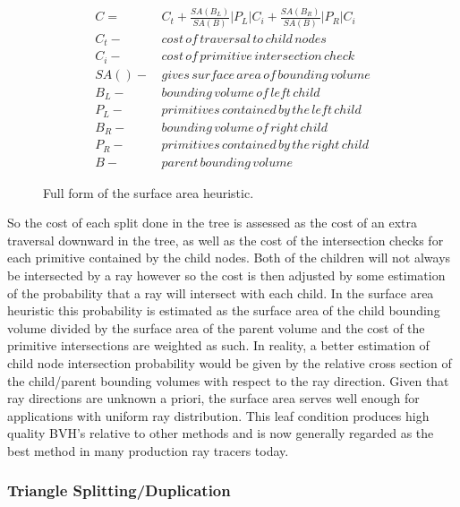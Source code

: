 \documentclass[12pt, a4paper]{article}
\begin{document}
\begin{figure}
  \caption{Full form of the surface area heuristic.}
  \label{SAH}
\begin{centering}
  \begin{align*}
    C = & \,C_{t} + \frac{SA(B_{L})}{SA(B)} |P_{L}|C_{i} +  \frac{SA(B_{R})}{SA(B)} |P_{R}|C_{i} \\ C_{t} - & \,cost\, of\, traversal\, to\, child\, nodes \\ C_{i} - & \, cost\, of\, primitive\, intersection\, check\, \\ SA() - & \, gives\, surface\, area\, of\, bounding\, volume \\ B_{L} - & \, bounding\, volume\, of\, left\, child \\ P_{L} - & \, primitives\, contained\, by\, the\, left\, child  \\ B_{R} - & \, bounding\, volume\, of\, right\, child \\ P_{R} - & \, primitives\, contained\, by\, the\, right\, child \\ B - & \, parent\, bounding\, volume
  \end{align*}
\end{centering}
\end{figure}

So the cost of each split done in the tree is assessed as the cost of an extra traversal downward in the tree, as well as the cost of the intersection checks for each primitive contained by the child nodes. Both of the children will not always be intersected by a ray however so the cost is then adjusted by some estimation of the probability that a ray will intersect with each child. In the surface area heuristic this probability is estimated as the surface area of the child bounding volume divided by the surface area of the parent volume and the cost of the primitive intersections are weighted as such. In reality, a better estimation of  child node intersection probability would be given by the relative cross section of the child/parent bounding volumes with respect to the ray direction. Given that ray directions are unknown a priori, the surface area serves well enough for applications with uniform ray distribution. This leaf condition produces high quality BVH's relative to other methods and is now generally regarded as the best method in many production ray tracers today.

\subsubsection{Triangle Splitting/Duplication}%
\end{document}

